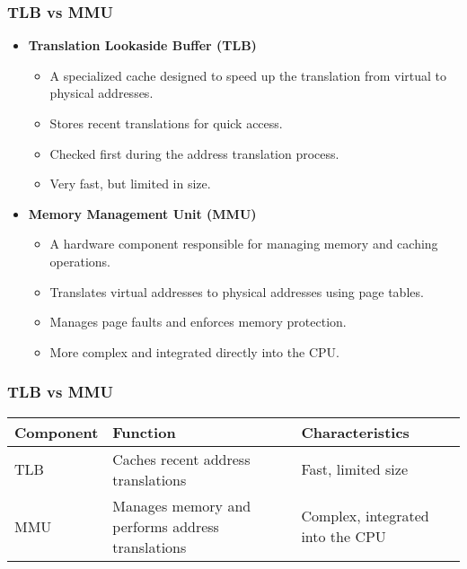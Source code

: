 \begin{frame}
    \frametitle{TLB vs MMU}

    \begin{itemize}
        \item \textbf{Translation Lookaside Buffer (TLB)}
        \begin{itemize}
            \item A specialized cache designed to speed up the translation from virtual to physical addresses.
            \item Stores recent translations for quick access.
            \item Checked first during the address translation process.
            \item Very fast, but limited in size.
        \end{itemize}
        \item \textbf{Memory Management Unit (MMU)}
        \begin{itemize}
            \item A hardware component responsible for managing memory and caching operations.
            \item Translates virtual addresses to physical addresses using page tables.
            \item Manages page faults and enforces memory protection.
            \item More complex and integrated directly into the CPU.
        \end{itemize}
    \end{itemize}
\end{frame}


\begin{frame}
    \frametitle{TLB vs MMU}
    \begin{table}[h!]
        \centering
        \begin{tabular}{|p{2cm}|p{4cm}|p{4cm}|}
            \hline
            \textbf{Component} & \textbf{Function} & \textbf{Characteristics} \\
            \hline
            TLB & Caches recent address translations & Fast, limited size \\
            \hline
            MMU & Manages memory and performs address translations & Complex, integrated into the CPU \\
            \hline
        \end{tabular}
    \end{table}
\end{frame}

